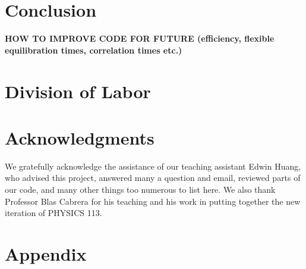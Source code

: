 \documentclass[twocolumn,aps,prl]{revtex4-1} %
\begin{document}
\section{Conclusion}
\textbf{HOW TO IMPROVE CODE FOR FUTURE (efficiency, flexible equilibration times, correlation times etc.)}

\section{Division of Labor}


\section{Acknowledgments}
We gratefully acknowledge the assistance of our teaching assistant Edwin Huang, who advised this project, answered many a question and email, reviewed parts of our code, and many other things too numerous to list here. We also thank Professor Blas Cabrera for his teaching and his work in putting together the new iteration of PHYSICS 113.


\section{Appendix}
\end{document}
